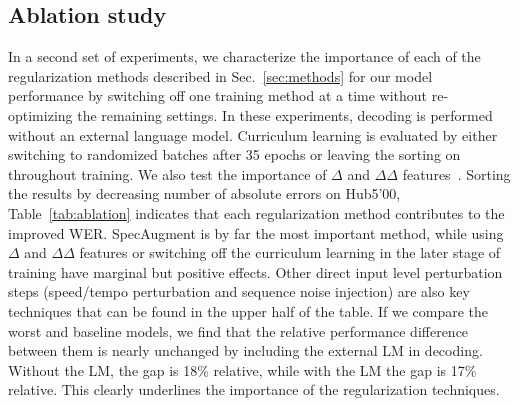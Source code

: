 \documentclass[a4paper]{article}
\begin{document}
\subsection{Ablation study}
In a second set of experiments, we characterize the importance of each of the regularization methods described in Sec.~\ref{sec:methods} for our model performance by switching off one training method at a time without re-optimizing the remaining settings. In these experiments, decoding is performed without an external language model.
Curriculum learning is evaluated by either switching to randomized batches after 35 epochs or leaving the sorting on throughout training.
We also test the importance of $\Delta$ and $\Delta\Delta$ features~\cite{Furui1981}.
Sorting the results by decreasing number of absolute errors on Hub5'00, Table~\ref{tab:ablation} indicates that each regularization method contributes to the improved WER.
SpecAugment is by far the most important method, while using $\Delta$ and $\Delta\Delta$ features or switching off the curriculum learning in the later stage of training have marginal but positive effects.
Other direct input level perturbation steps (speed/tempo perturbation and sequence noise injection) are also key techniques that can be found in the upper half of the table.
If we compare the worst and baseline models, we find that the relative performance difference between them is nearly unchanged by including the external LM in decoding.
Without the LM, the gap is 18\% relative, while with the LM the gap is 17\% relative.
This clearly underlines the importance of the regularization techniques.
\end{document}
